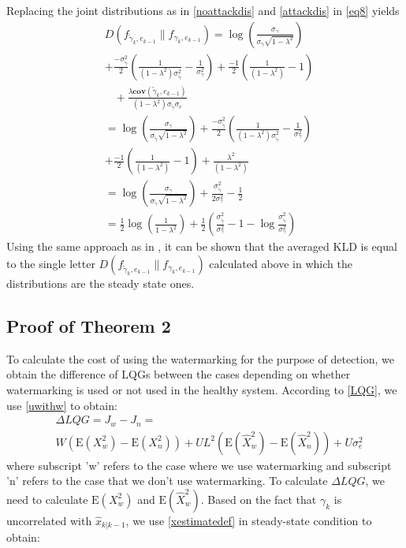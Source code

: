 \documentclass[journal,10pt]{IEEEtran}
\def\no{\nonumber}
\begin{document}
Replacing the joint distributions as in \eqref{noattackdis} and
\eqref{attackdis} in \eqref{eq8} yields
\begin{align}
&D(f_{\widetilde{\gamma}_{k}, e_{k-1}} \|f_{\gamma_{k}, e_{k-1}}) = 
\log(\frac{\sigma_{\gamma}}{\sigma_{\tilde{\gamma}}\sqrt{1-\lambda^{2}}}) \no \\
& +\frac{-\sigma_{\tilde{\gamma}}^{2}}{2}
(\frac{1}{(1-\lambda^{2})\sigma_{\tilde{\gamma}}^{2}}-\frac{1}{\sigma_{\gamma}^{2}})+\frac{-1}{2}
(\frac{1}{(1-\lambda^{2})}-1)\no\\
& \;\; \; +\frac{\lambda
\textbf{cov}(\tilde{\gamma}_{k},e_{k-1})}{(1-\lambda^{2})\sigma_{\tilde{\gamma}}\sigma_{e}}\no\\
&=\log(\frac{\sigma_{\gamma}}{\sigma_{\tilde{\gamma}}\sqrt{1-\lambda^{2}}})+\frac{-\sigma_{\tilde{\gamma}}^{2}}{2}
(\frac{1}{(1-\lambda^{2})\sigma_{\tilde{\gamma}}^{2}}-\frac{1}{\sigma_{\gamma}^{2}}) \no \\ 
& +\frac{-1}{2}
(\frac{1}{(1-\lambda^{2})}-1)
+\frac{\lambda^{2}}{(1-\lambda^{2})}\no\\
&=\log(\frac{\sigma_{\gamma}}{\sigma_{\tilde{\gamma}}\sqrt{1-\lambda^{2}}})+\frac{\sigma_{\tilde{\gamma}}^{2}}{2\sigma_{\gamma}^{2}}-\frac{1}{2}\no\\
&=\frac{1}{2}\log(\frac{1}{1-\lambda^{2}})+
\frac{1}{2}(\frac{\sigma_{\tilde{\gamma}}^{2}}{\sigma_{\gamma}^{2}}-1-\log\frac{\sigma_{\tilde{\gamma}}^{2}}{\sigma_{\gamma}^{2}})\no
\end{align}
Using the same approach as in \cite{enoch}, it can be shown that the
averaged KLD is equal to the single letter $D(f_{\widetilde{\gamma}_{k}, e_{k-1}} \|f_{\gamma_{k}, e_{k-1}})$ calculated
above in which the distributions are the steady state ones.

\subsection{Proof of Theorem 2}
To calculate the cost of using the watermarking for the purpose of
detection, we obtain the difference of LQGs between the cases depending on whether  watermarking
is used or not used  in the healthy system. According to \eqref{LQG}, we use \eqref{uwithw} to
obtain:
\begin{eqnarray}
&\Delta LQG=J_{w}-J_{n}=\no\\
& W(\mathrm{E}(X_{w}^{2})\!-\!\mathrm{E}(X_{n}^{2}))\!+\!
UL^{2}(\mathrm{E}(\hat{X}_{w}^{2})\!-\!\mathrm{E}(\hat{X}_{n}^{2}))\!+\!U\sigma_{e}^{2}\label{deltaLQG}
\end{eqnarray}
where subscript 'w' refers to the case where we use watermarking and
subscript 'n' refers to the case that we don't use watermarking. To
calculate $\Delta LQG$, we need to calculate $\mathrm{E}(X_{w}^{2})$
and $\mathrm{E}(\hat{X}_{w}^{2})$. Based on the fact that
$\gamma_{k}$ is uncorrelated with $\hat{x}_{k|k-1}$, we use
\eqref{xestimatedef} in steady-state condition to obtain:
\end{document}

